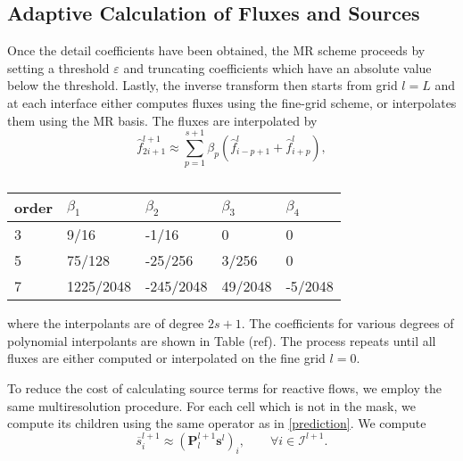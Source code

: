\documentclass[]{article}
\begin{document}
    \subsection*{Adaptive Calculation of Fluxes and Sources}

        Once the detail coefficients have been obtained, the MR scheme
        proceeds by setting a threshold $\varepsilon$ and truncating coefficients
        which have an absolute value below the threshold. Lastly, the inverse
        transform then starts from grid $l=L$ and at each interface either
        computes fluxes using the fine-grid scheme, or interpolates them using
        the MR basis. The fluxes are interpolated by
        \begin{equation}
            \hat{f}_{2i+1}^{l+1} \approx \sum_{p=1}^{s+1} \beta_{p} \left(
            \hat{f}^{l}_{i-p+1} + \hat{f}^{l}_{i+p} \right),
        \end{equation}
        \begin{table}[]
            \center
            \begin{tabular}{|l|l|l|l|l|}
            \hline
                order    & $\beta_{1}$ & $\beta_{2}$ & $\beta_{3}$ & $\beta_{4}$ \\ \hline
                3 & 9/16         & -1/16        & 0            & 0 \\ \hline
                5 & 75/128       & -25/256      & 3/256        & 0 \\ \hline
                7 & 1225/2048    & -245/2048    & 49/2048      & -5/2048 \\ \hline
            \end{tabular}
            \label{coeff2}
            \caption{}
        \end{table}
        where the interpolants are of degree $2s+1$. The coefficients for
        various degrees of polynomial interpolants are shown in Table (ref).
        The process repeats until all fluxes are either computed or
        interpolated on the fine grid $l=0$.

        To reduce the cost of calculating source terms for reactive flows, we employ
        the same multiresolution procedure. For each cell which is not in the mask,
        we compute its children using the same operator as in \ref{prediction}.
        We compute
        \begin{equation}
            \overline{s}_{i}^{l+1} \approx \left( \bm{P}_{l}^{l+1} \bm{s}^{l}
                \right)_{i}, \text{ } \text{ } \text{ } \forall i \in
                \bm{\mathcal{I}}^{l+1}.
        \end{equation}
\end{document}
